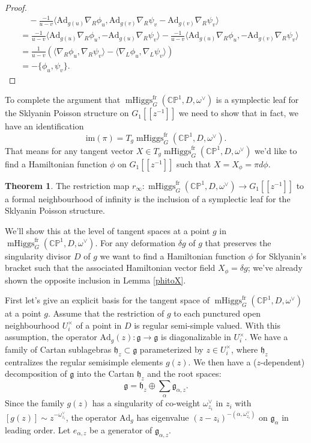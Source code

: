 \documentclass[11pt, oneside, reqno]{amsart}
\theoremstyle{definition} \newtheorem{definition}{Definition}[section]
\newtheorem{theorem}[definition]{Theorem}
\theoremstyle{definition} \newtheorem{remark}[definition]{Remark}
\theoremstyle{definition} \newtheorem{remarks}[definition]{Remarks}
\theoremstyle{definition} \newtheorem{question}[definition]{Question}
\theoremstyle{definition} \newtheorem*{note}{Note}
\theoremstyle{definition} \newtheorem{example}[definition]{Example}
\theoremstyle{definition} \newtheorem{examples}[definition]{Examples}
\renewcommand{\gg}{\mathfrak{g}}
\newcommand{\hh}{\mathfrak{h}}
\newcommand{\bb}[1]{\mathbb{#1}}
\newcommand{\mr}[1]{\mathrm{#1}}
\DeclareMathOperator{\mhiggs}{mHiggs}
\newcommand{\fr}{\mathrm{fr}}
\newcommand{\Ad}{\mr{Ad}}
\begin{document}
\begin{proof}
\begin{align*}
   &\quad - \frac{-1}{u - v}  \langle \Ad_{g(u)} \nabla_{R} \phi_{u} , \Ad_{g(v)} \nabla_{R} \psi_{v}  - \Ad_{g(v)} \nabla_{R} \psi_{v}   \rangle \\
      &=   \frac{-1}{u - v}  \langle \Ad_{g(u)} \nabla_{R} \phi_{u} ,  - \Ad_{g(u)} \nabla_{R} \psi_{v} \rangle   - \frac{-1}{u - v}  \langle \Ad_{g(u)} \nabla_{R} \phi_{u} ,  - \Ad_{g(v)} \nabla_{R} \psi_{v}   \rangle \\
   &= \frac{1}{u - v} (\langle \nabla_{R} \phi_{u} , \nabla_{R} \psi_{v}\rangle - 
   \langle  \nabla_{L} \phi_{u} , \nabla_{L} \psi_{v} \rangle ) \\
   &=  - \{\phi_{u}, \psi_{v} \}.
  \end{align*}
\end{proof}

To complete the argument that $\mhiggs^\fr_G(\bb{CP}^1, D, \omega^\vee)$ is a symplectic leaf for the Sklyanin Poisson structure on $G_1[[z^{-1}]]$ we need to show that in fact, we have an identification 
\[\mr{im}(\pi) = T_g \mhiggs^\fr_G(\bb{CP}^1, D, \omega^\vee).\]
That means for any tangent vector $X \in T_g \mhiggs^\fr_G(\bb{CP}^1, D, \omega^\vee)$ we'd like to find a Hamiltonian
function $\phi$ on $G_1[[z^{-1}]]$ such that $X = X_{\phi} = \pi d \phi$.

\begin{theorem}\label{theorem:symplectic_leaf}
The restriction map $r_\infty \colon \mhiggs^\fr_G(\bb{CP}^1, D, \omega^\vee) \to G_1[[z^{-1}]]$ to a formal neighbourhood of infinity is the inclusion of a symplectic leaf for the Sklyanin Poisson structure.
\end{theorem}

We'll show this at the level of tangent spaces at a point $g$ in $\mhiggs^\fr_G(\bb{CP}^1, D, \omega^\vee)$.  For any deformation $\delta g $ of $g$ that preserves the singularity divisor $D$ of $g$ we want to find a Hamiltonian function $\phi$ for Sklyanin's bracket such that the associated Hamiltonian vector field $X_\phi = \delta g$; we've already shown the opposite inclusion in Lemma \ref{phitoX}.

First let's give an explicit basis for the tangent space of $\mhiggs^\fr_G(\bb{CP}^1, D, \omega^\vee)$ at a point $g$.  Assume that the restriction of $g$ to each punctured open neighbourhood $U^\times_i$ of a point in $D$ is regular semi-simple valued.  With this assumption, the operator $\Ad_{g}(z): \gg \to \gg$ is diagonalizable in $U_{i}^{\times}$.  We have a family of Cartan sublagebras $\hh_{z} \subset \gg$ parameterized by $z \in U_{i}^{\times}$, where $\hh_z$ centralizes the regular semisimple elements $g(z)$.  We then have a ($z$-dependent) decomposition of $\gg$ into the Cartan $\hh_z$ and the root spaces:
\[\gg = \hh_{z} \oplus \sum_{\alpha} \gg_{\alpha,z}.\]
Since the family $g(z)$ has a singularity of co-weight $\omega_{z_i}^{\vee}$ in $z_i$ with $[g(z)] \sim z^{-\omega_{z_i}^{\vee}}$, the operator $\Ad_{g}$ has eigenvalue $ (z - z_i)^{- (\alpha, \omega^{\vee}_{z_i})}$ on $\gg_{\alpha}$
in leading order. Let $e_{\alpha, z}$ be a generator of $\gg_{\alpha, z}$.
\end{document}
